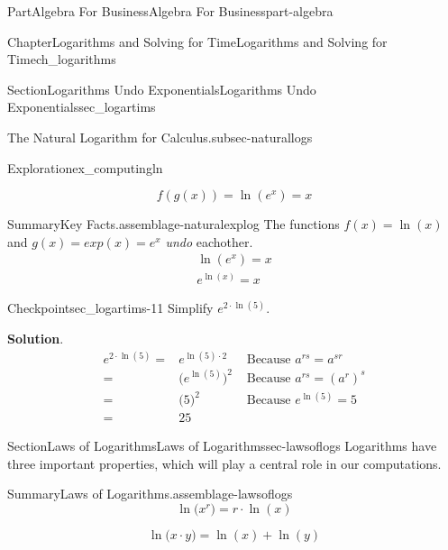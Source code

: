 \documentclass[oneside,10pt,]{tufte-book}
\newcommand{\blocktitlefont}{\relax}
\numberwithin{equation}{chapter}
\newcommand{\amp}{&}
\begin{document}
\begin{partptx}{Part}{Algebra For Business}{}{Algebra For Business}{}{}{part-algebra}
\begin{chapterptx}{Chapter}{Logarithms and Solving for Time}{}{Logarithms and Solving for Time}{}{}{ch_logarithms}
\begin{sectionptx}{Section}{Logarithms Undo Exponentials}{}{Logarithms Undo Exponentials}{}{}{sec_logartims}
\begin{paragraphs}{The Natural Logarithm for Calculus.}{subsec-naturallogs}
\begin{exploration}{Exploration}{}{ex_computingln}
\begin{enumerate}[font=\bfseries,label=(\alph*),ref=\alph*]
\begin{equation*}
\end{equation*}
%
\begin{equation*}
f(g(x)) = \ln(e^{x}) = x
\end{equation*}
%
\end{enumerate}%
\end{exploration}%
\begin{assemblage}{Summary}{Key Facts.}{assemblage-naturalexplog}%
The functions \(f(x) = \ln(x)\) and \(g(x) = exp(x) = e^x\) \emph{undo} eachother.%
\begin{gather*}
\ln\left(e^x\right) = x \\
e^{\ln(x)} = x 
\end{gather*}
%
\end{assemblage}
\end{paragraphs}%
\begin{inlineexercise}{Checkpoint}{}{sec_logartims-11}%
Simplify \(e^{2\cdot \ln(5)}\).%
\par\smallskip%
\noindent\textbf{\blocktitlefont Solution}.\hypertarget{sec_logartims-11-2}{}\quad{}%
\begin{align*}
e^{2\cdot \ln(5)} = \amp e^{\ln(5)\cdot 2}      
\amp \text{ Because } a^{rs} = a^{sr}    \\
= \amp \Big(e^{\ln(5)}\Big)^2
\amp \text{ Because } a^{rs} = (a^r)^{s} \\
= \amp \Big(5\Big)^2         
\amp  \text{ Because } e^{\ln(5)} = 5     \\
= \amp 25                     
\amp 
\end{align*}
%
\end{inlineexercise}%
\end{sectionptx}
%
%
\typeout{************************************************}
\typeout{************************************************}
%
\begin{sectionptx}{Section}{Laws of Logarithms}{}{Laws of Logarithms}{}{}{sec-lawsoflogs}
Logarithms have three important properties, which will play a central role in our computations.%
\begin{assemblage}{Summary}{Laws of Logarithms.}{assemblage-lawsoflogs}%
%
\begin{equation*}
\ln\Big( x^r \Big)= r\cdot \ln(x)
\end{equation*}
%
\par
%
\begin{equation*}
\ln\Big( x\cdot y \Big)= \ln(x) + \ln(y)
\end{equation*}
%
\par

\end{assemblage}
\end{sectionptx}
\end{chapterptx}
\end{partptx}
\end{document}
